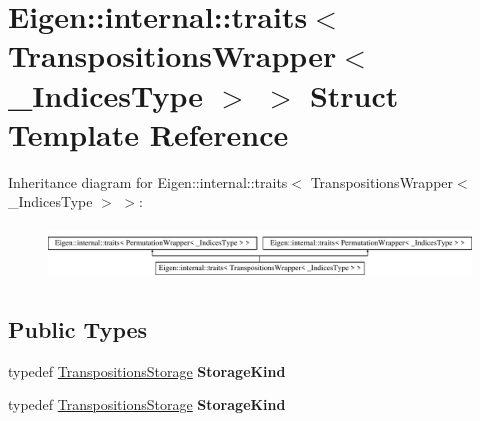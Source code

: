\hypertarget{struct_eigen_1_1internal_1_1traits_3_01_transpositions_wrapper_3_01___indices_type_01_4_01_4}{}\section{Eigen\+:\+:internal\+:\+:traits$<$ Transpositions\+Wrapper$<$ \+\_\+\+Indices\+Type $>$ $>$ Struct Template Reference}
\label{struct_eigen_1_1internal_1_1traits_3_01_transpositions_wrapper_3_01___indices_type_01_4_01_4}
Inheritance diagram for Eigen\+:\+:internal\+:\+:traits$<$ Transpositions\+Wrapper$<$ \+\_\+\+Indices\+Type $>$ $>$\+:\begin{figure}[H]
\begin{center}
\leavevmode
\includegraphics[height=1.450777cm]{struct_eigen_1_1internal_1_1traits_3_01_transpositions_wrapper_3_01___indices_type_01_4_01_4}
\end{center}
\end{figure}
\subsection*{Public Types}
\begin{DoxyCompactItemize}
\item 
\mbox{\label{struct_eigen_1_1internal_1_1traits_3_01_transpositions_wrapper_3_01___indices_type_01_4_01_4_aea036f22fc1651d176a90241e96ae4d9}} 
typedef \hyperlink{struct_eigen_1_1_transpositions_storage}{Transpositions\+Storage} {\bfseries Storage\+Kind}
\item 
\mbox{\label{struct_eigen_1_1internal_1_1traits_3_01_transpositions_wrapper_3_01___indices_type_01_4_01_4_aea036f22fc1651d176a90241e96ae4d9}} 
typedef \hyperlink{struct_eigen_1_1_transpositions_storage}{Transpositions\+Storage} {\bfseries Storage\+Kind}
\end{DoxyCompactItemize}


